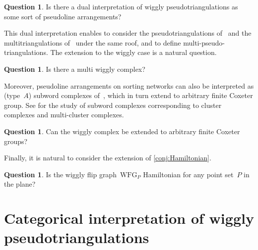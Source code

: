 \documentclass{amsart}
\theoremstyle{definition}
\newtheorem{question}[theorem]{Question}
\newcommand{\wigglyFlipGraph}{\mathrm{WFG}} %
\begin{document}
\begin{question}
Is there a dual interpretation of wiggly pseudotriangulations as some sort of pseudoline arrangements? 
\end{question}

This dual interpretation enables \cite{PilaudPocchiola} to consider the pseudotriangulations of~\cite{PocchiolaVegter,RoteSantosStreinu-pseudotriangulations} and the multitriangulations of~\cite{PilaudSantos-multitriangulations} under the same roof, and to define multi-pseudo-triangulations.
The extension to the wiggly case is a natural question.

\begin{question}
Is there a multi wiggly complex?
\end{question}

Moreover, pseudoline arrangements on sorting networks can also be interpreted as (type~$A$) subword complexes of~\cite{KnutsonMiller-subwordComplex}, which in turn extend to arbitrary finite Coxeter group.
See \cite{Stump, CeballosLabbeStump} for the study of subword complexes corresponding to cluster complexes and multi-cluster complexes.

\begin{question}
Can the wiggly complex be extended to arbitrary finite Coxeter groups?
\end{question}


Finally, it is natural to consider the extension of \cref{conj:Hamiltonian}.

\begin{question}
\label{qu:Hamiltonian}
Is the wiggly flip graph~$\wigglyFlipGraph_P$ Hamiltonian for any point set~$P$ in the plane?
\end{question}



\section{Categorical interpretation of wiggly pseudotriangulations}
\label{sec:categoricalInterpretation}
\end{document}
